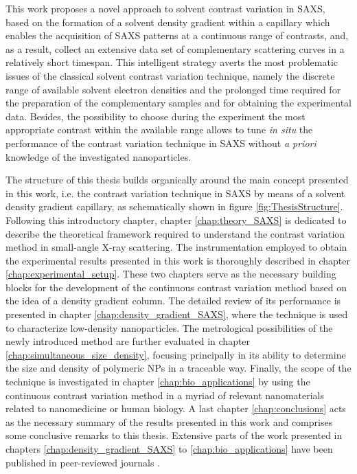 This work proposes a novel approach to solvent contrast variation in SAXS, based on the formation of a solvent density gradient within a capillary which enables the acquisition of SAXS patterns at a continuous range of contrasts, and, as a result, collect an extensive data set of complementary scattering curves in a relatively short timespan. This intelligent strategy averts the most problematic issues of the classical solvent contrast variation technique, namely the discrete range of available solvent electron densities and the prolonged time required for the preparation of the complementary samples and for obtaining the experimental data. Besides, the possibility to choose during the experiment the most appropriate contrast within the available range allows to tune \emph{in situ} the performance of the contrast variation technique in SAXS without \emph{a priori} knowledge of the investigated nanoparticles.

The structure of this thesis builds organically around the main concept presented in this work, i.e. the contrast variation technique in SAXS by means of a solvent density gradient capillary, as schematically shown in figure \ref{fig:ThesisStructure}. Following this introductory chapter, chapter \ref{chap:theory_SAXS} is dedicated to describe the theoretical framework required to understand the contrast variation method in small-angle X-ray scattering. The instrumentation employed to obtain the experimental results presented in this work is thoroughly described in chapter \ref{chap:experimental_setup}. These two chapters serve as the necessary building blocks for the development of the continuous contrast variation method based on the idea of a density gradient column. The detailed review of its performance is presented in chapter \ref{chap:density_gradient_SAXS}, where the technique is used to characterize low-density nanoparticles. The metrological possibilities of the newly introduced method are further evaluated in chapter \ref{chap:simultaneous_size_density}, focusing principally in its ability to determine the size and density of polymeric NPs in a traceable way. Finally, the scope of the technique is investigated in chapter \ref{chap:bio_applications} by using the continuous contrast variation method in a myriad of relevant nanomaterials related to nanomedicine or human biology. A last chapter \ref{chap:conclusions} acts as the necessary summary of the results presented in this work and comprises some conclusive remarks to this thesis. Extensive parts of the work presented in chapters \ref{chap:density_gradient_SAXS} to \ref{chap:bio_applications} have been published in peer-reviewed journals \citep{minelli_characterization_2014,garcia-diez_nanoparticle_2015,garcia-diez_size_2016,garcia-diez_simultaneous_2016-1}.

